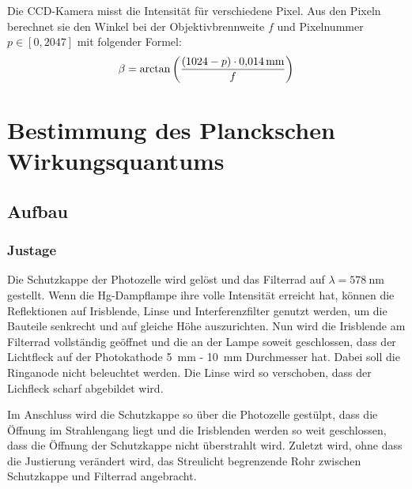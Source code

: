 Die CCD-Kamera misst die Intensität für verschiedene Pixel. Aus den Pixeln
berechnet sie den Winkel bei der Objektivbrennweite $f$ und Pixelnummer $p \in
[0, 2047]$ mit folgender Formel:
\[
    \beta = \arctan\del{\frac{(1024 - p) \cdot \SI{0.014}{\milli\meter}}f}
\]


\FloatBarrier
\section{Bestimmung des Planckschen Wirkungsquantums}

\FloatBarrier
\subsection{Aufbau}

\begin{figure}[htbp]
    \centering
    \caption{%
        \cite[Abbildung~P402.1]{physik412-Anleitung}
    }
    \label{fig:P402.1}
\end{figure}

\FloatBarrier
\subsubsection{Justage}

Die Schutzkappe der Photozelle wird gelöst und das Filterrad auf $\lambda =
\SI{578}{\nano\meter}$ gestellt. Wenn die Hg-Dampflampe ihre volle Intensität
erreicht hat, können die Reflektionen auf Irisblende, Linse und
Interferenzfilter genutzt werden, um die Bauteile senkrecht und auf gleiche
Höhe auszurichten. Nun wird die Irisblende am Filterrad vollständig geöffnet
und die an der Lampe soweit geschlossen, dass der Lichtfleck auf der
Photokathode \SI{5}{\milli\meter} - \SI{10}{\milli\meter} Durchmesser hat.
Dabei soll die Ringanode nicht beleuchtet werden. Die Linse wird so verschoben,
dass der Lichfleck scharf abgebildet wird.

Im Anschluss wird die Schutzkappe so über die Photozelle gestülpt, dass
die Öffnung im Strahlengang liegt und die Irisblenden werden so weit
geschlossen, dass die Öffnung der Schutzkappe nicht überstrahlt wird.
Zuletzt wird, ohne dass die Justierung verändert wird, das Streulicht
begrenzende Rohr zwischen Schutzkappe und Filterrad angebracht.

